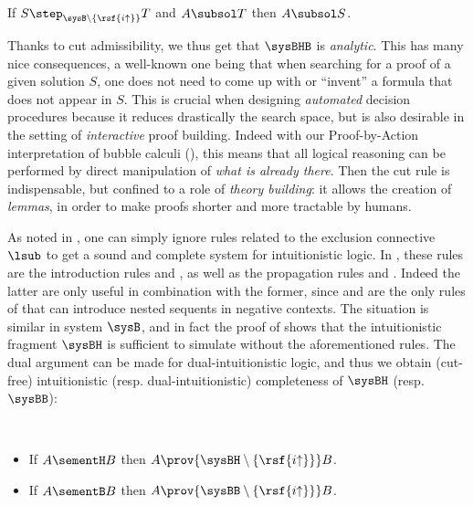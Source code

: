 \begin{fact}\label{cor:subformula-property}
  If $S \step_{\sysB \setminus \{\rsf{i{\uparrow}}\}} T$ and $A \subsol T$ then
  $A \subsol S$.
\end{fact}

Thanks to cut admissibility, we thus get that $\sysBHB$ is \emph{analytic}. This
has many nice consequences, a well-known one being that when searching for a
proof of a given solution $S$, one does not need to come up with or ``invent'' a
formula that does not appear in $S$. This is crucial when designing
\emph{automated} decision procedures because it reduces drastically the search
space, but is also desirable in the setting of \emph{interactive} proof
building. Indeed with our Proof-by-Action interpretation of bubble calculi
(), this means that all logical reasoning can be performed
by direct manipulation of \emph{what is already there}. Then the cut rule is
indispensable, but confined to a role of \emph{theory building}: it allows the
creation of \emph{lemmas}, in order to make proofs shorter and more tractable by
humans.

As noted in \cite{postniece_deep_2009}, one can simply ignore rules related to
the exclusion connective $\lsub$ to get a sound and complete system for
intuitionistic logic. In , these rules are the introduction rules
 and , as well as the propagation rules
 and . Indeed the latter are only useful in
combination with the former, since  and  are the
only rules of  that can introduce nested sequents in negative
contexts. The situation is similar in system $\sysB$, and in fact the proof of
 shows that the intuitionistic fragment $\sysBH$ is
sufficient to simulate  without the aforementioned rules. The dual
argument can be made for dual-intuitionistic logic, and thus we obtain
(cut-free) intuitionistic (resp. dual-intuitionistic) completeness of $\sysBH$
(resp. $\sysBB$):

\begin{corollary}
  ~\\\vspace{-1em}
  \begin{itemize}
    \item If $A \sementH B$ then $A \prov{\sysBH \setminus
    \{\rsf{i{\uparrow}}\}} B$.
    \item If $A \sementB B$ then $A \prov{\sysBB \setminus
    \{\rsf{i{\uparrow}}\}} B$.
  \end{itemize}
\end{corollary}

